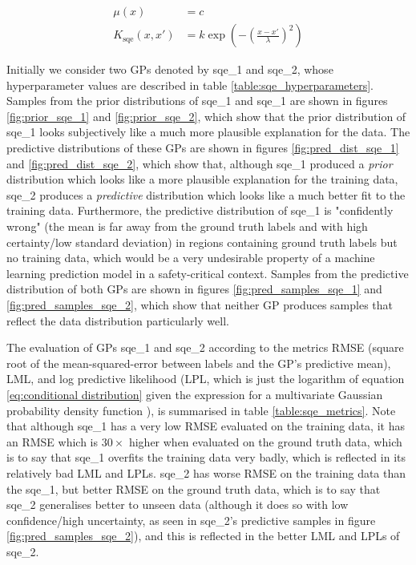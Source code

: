 \documentclass{article}
\begin{document}
\begin{align}
\mu(x) &= c \\
K_{\mathrm{sqe}}(x, x') &= k \exp\left( -\left( \frac{x - x'}{\lambda} \right)^2 \right)
\end{align}

Initially we consider two GPs denoted by sqe\_1 and sqe\_2, whose hyperparameter values are described in table \ref{table:sqe_hyperparameters}. Samples from the prior distributions of sqe\_1 and sqe\_1 are shown in figures \ref{fig:prior_sqe_1} and \ref{fig:prior_sqe_2}, which show that the prior distribution of sqe\_1 looks subjectively like a much more plausible explanation for the data. The predictive distributions of these GPs are shown in figures \ref{fig:pred_dist_sqe_1} and \ref{fig:pred_dist_sqe_2}, which show that, although sqe\_1 produced a \emph{prior} distribution which looks like a more plausible explanation for the training data, sqe\_2 produces a \emph{predictive} distribution which looks like a much better fit to the training data. Furthermore, the predictive distribution of sqe\_1 is "confidently wrong" (the mean is far away from the ground truth labels and with high certainty/low standard deviation) in regions containing ground truth labels but no training data, which would be a very undesirable property of a machine learning prediction model in a safety-critical context. Samples from the predictive distribution of both GPs are shown in figures \ref{fig:pred_samples_sqe_1} and \ref{fig:pred_samples_sqe_2}, which show that neither GP produces samples that reflect the data distribution particularly well.

The evaluation of GPs sqe\_1 and sqe\_2 according to the metrics RMSE (square root of the mean-squared-error between labels and the GP's predictive mean), LML, and log predictive likelihood (LPL, which is just the logarithm of equation \ref{eq:conditional distribution} given the expression for a multivariate Gaussian probability density function \cite{bishop2006pattern}), is summarised in table \ref{table:sqe_metrics}. Note that although sqe\_1 has a very low RMSE evaluated on the training data, it has an RMSE which is $30\times$ higher when evaluated on the ground truth data, which is to say that sqe\_1 overfits the training data very badly, which is reflected in its relatively bad LML and LPLs. sqe\_2 has worse RMSE on the training data than the sqe\_1, but better RMSE on the ground truth data, which is to say that sqe\_2 generalises better to unseen data (although it does so with low confidence/high uncertainty, as seen in sqe\_2's predictive samples in figure \ref{fig:pred_samples_sqe_2}), and this is reflected in the better LML and LPLs of sqe\_2.
\end{document}
